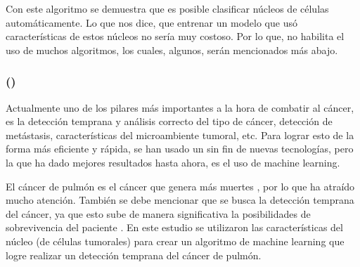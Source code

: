 \documentclass[12pt, letterpaper]{article}
\begin{document}
Con este algoritmo se demuestra que es posible clasificar núcleos de células automáticamente. Lo que nos dice, que entrenar un modelo que usó características de estos núcleos no sería muy costoso. Por lo que, no habilita el uso de muchos algoritmos, los cuales, algunos, serán mencionados más abajo.


\newpage

\subsubsection{\texorpdfstring{ (\citeauthor{kancherlaEarlyLungCancer2013})}{}}

Actualmente uno de los pilares más importantes a la hora de combatir al cáncer, es la detección temprana y análisis correcto del tipo de cáncer, detección de metástasis, características del microambiente tumoral, etc. Para lograr esto de la forma más eficiente y rápida, se han usado un sin fin de nuevas tecnologías, pero la que ha dado mejores resultados hasta ahora, es el uso de machine learning. 

El cáncer de pulmón es el cáncer que genera más muertes \autocite{CommonCancerTypes2015b}, por lo que ha atraído mucho atención. También se debe mencionar que se busca la detección temprana del cáncer, ya que esto sube de manera significativa la posibilidades de sobrevivencia del paciente \autocite{WHOEarlyDetection}.  En este estudio se utilizaron las características del núcleo (de células tumorales) para crear un algoritmo de machine learning que logre realizar un detección temprana del cáncer de pulmón. 
\end{document}
